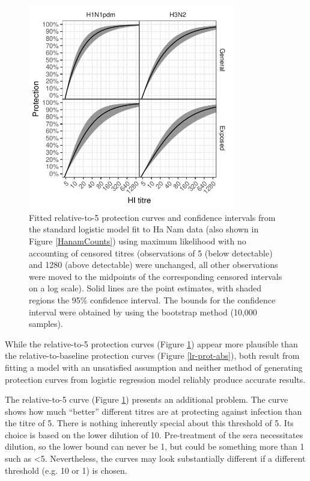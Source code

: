 \documentclass[12pt]{article}
\begin{document}
\begin{figure}[htp]
	\centering
	\includegraphics[width=0.8\textwidth]{../fit-logistic-boot-plot/hanam-hi-prot-rel.pdf}
	\caption{
	Fitted relative-to-5 protection curves and confidence intervals from the standard logistic model fit to Ha Nam data (also shown in Figure \ref{HanamCounts}) using maximum likelihood with no accounting of censored titres (observations of 5 (below detectable) and 1280 (above detectable) were unchanged, all other observations were moved to the midpoints of the corresponding censored intervals on a log scale). Solid lines are the point estimates, with shaded regions the 95\% confidence interval. The bounds for the confidence interval were obtained by using the bootstrap method (10,000 samples).
	}
	\label{lr-prot-rel}
\end{figure}

While the relative-to-5 protection curves (Figure \ref{lr-prot-rel}) appear more plausible than the relative-to-baseline protection curves (Figure \ref{lr-prot-abs}), both result from fitting a model with an unsatisfied assumption and neither method of generating protection curves from logistic regression model reliably produce accurate results.

The relative-to-5 curve (Figure \ref{lr-prot-rel}) presents an additional problem. The curve shows how much ``better'' different titres are at protecting against infection than the titre of 5. 
There is nothing inherently special about this threshold of 5. Its choice is based on the lower dilution of 10. Pre-treatment of the sera necessitates dilution, so the lower bound can never be 1, but could be something more than 1 such as <5.  Nevertheless, the curves may look substantially different if a different threshold (e.g. 10 or 1) is chosen.
\end{document}
